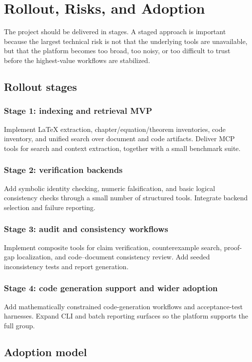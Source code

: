 \chapter{Rollout, Risks, and Adoption}

The project should be delivered in stages. A staged approach is important because the largest technical risk is not that the underlying tools are unavailable, but that the platform becomes too broad, too noisy, or too difficult to trust before the highest-value workflows are stabilized.

\section{Rollout stages}

\subsection*{Stage 1: indexing and retrieval MVP}
Implement LaTeX extraction, chapter/equation/theorem inventories, code inventory, and unified search over document and code artifacts. Deliver MCP tools for search and context extraction, together with a small benchmark suite.

\subsection*{Stage 2: verification backends}
Add symbolic identity checking, numeric falsification, and basic logical consistency checks through a small number of structured tools. Integrate backend selection and failure reporting.

\subsection*{Stage 3: audit and consistency workflows}
Implement composite tools for claim verification, counterexample search, proof-gap localization, and code--document consistency review. Add seeded inconsistency tests and report generation.

\subsection*{Stage 4: code generation support and wider adoption}
Add mathematically constrained code-generation workflows and acceptance-test harnesses. Expand CLI and batch reporting surfaces so the platform supports the full group.

\section{Adoption model}

